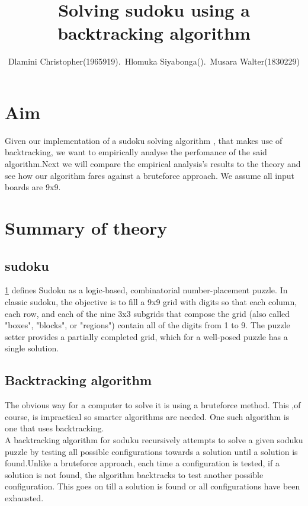 \documentclass[11pt]{report}
\title{\textbf{{\Large Solving sudoku using a backtracking algorithm}}}
\author{Dlamini Christopher(1965919).~Hlomuka Siyabonga().~Musara Walter(1830229)}
\begin{document}
\maketitle
    \section{Aim}
        Given our implementation of a sudoku solving algorithm , that makes use of backtracking, we want to empirically analyse 
        the perfomance of the said algorithm.Next we will compare the empirical analysis's results to the theory and see how our algorithm fares against
        a bruteforce approach. We assume all input boards are 9x9.

    \section{Summary of theory}
        \subsection{sudoku}
            \hyperref[sec:wikiwand]{1} defines Sudoku as a logic-based, combinatorial number-placement puzzle. In classic sudoku, the objective is
            to fill a 9x9 grid with digits so that each column, each row, and each of the nine 3x3 subgrids that
            compose the grid (also called "boxes", "blocks", or "regions") contain all of the digits from 1 to 9.
            The puzzle setter provides a partially completed grid, which for a well-posed puzzle has a single
            solution.             

        \subsection{Backtracking algorithm}
            The obvious way for a computer to solve it is using a bruteforce method. This ,of course, is impractical so smarter algorithms are 
            needed. One such algorithm is one that uses backtracking.\\

            A backtracking algorithm for soduku recursively attempts to solve a given soduku
            puzzle by testing all possible configurations towards a solution until a solution is found.Unlike a bruteforce approach, each time a
            configuration is tested, if a solution is not found, the algorithm backtracks to test another possible
            configuration. This goes on till a solution is found or all configurations have been exhausted.
\end{document}
